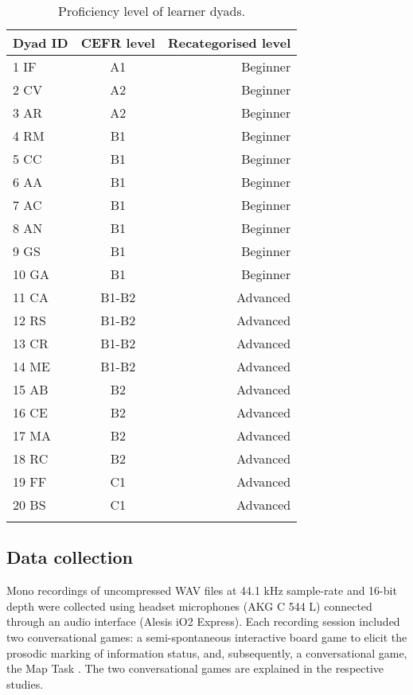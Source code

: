\begin{table}
\begin{tabular}{lcr}
\lsptoprule
{Dyad ID} & {CEFR level} & {Recategorised level}\\
\midrule
1  IF & A1 & Beginner\\
2  CV & A2 & Beginner\\
3  AR & A2 & Beginner\\
4  RM & B1 & Beginner\\
5  CC & B1 & Beginner\\
6  AA & B1 & Beginner\\
7  AC & B1 & Beginner\\
8  AN & B1 & Beginner\\
9  GS & B1 & Beginner\\
10  GA & B1 & Beginner\\
11  CA & B1-B2 & Advanced\\
12  RS & B1-B2 & Advanced\\
13  CR & B1-B2 & Advanced\\
14  ME & B1-B2 & Advanced\\
15  AB & B2 & Advanced\\
16  CE & B2 & Advanced\\
17  MA & B2 & Advanced\\
18  RC & B2 & Advanced\\
19  FF & C1 & Advanced\\
20  BS & C1 & Advanced\\
\lspbottomrule
\end{tabular}
\caption{Proficiency level of learner dyads.}
\label{tab:key:1}
\end{table}

\subsection{Data collection}
\label{sec:1.3.2}

Mono recordings of uncompressed WAV files at 44.1 kHz sample-rate and 16-bit depth were collected using headset microphones (AKG C 544 L) connected through an audio interface (Alesis iO2 Express). Each recording session included two conversational games: a semi-spontaneous interactive board game to elicit the prosodic marking of information status, and, subsequently, a conversational game, the Map Task \citep{AndersonEtAl1991}. The two conversational games are explained in the respective studies.

